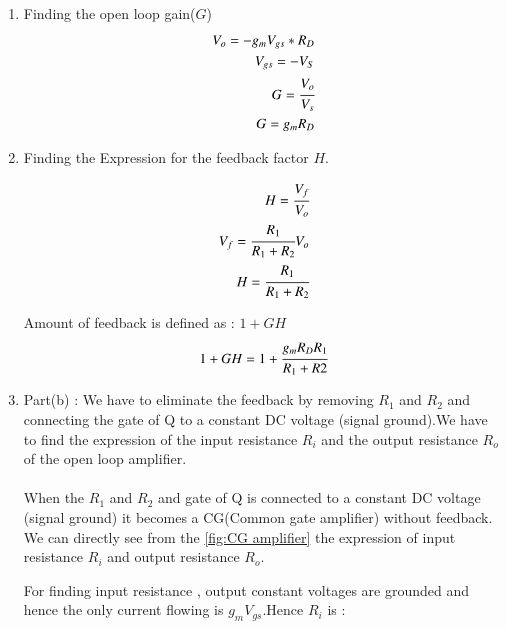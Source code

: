 \begin{enumerate}[label=\arabic*.,ref=\theenumi]
\item Finding the open loop gain($G$)\\
\solution
\begin{align}
V_{o} = -g_{m}V_{gs}*R_{D}\\
V_{gs} = -V_{S}\\
G = \cfrac{V_{o}}{V_{s}}\\
G = g_{m}R_{D}
\end{align}

\item Finding the Expression for the feedback factor $H$.\\
\solution

\begin{align}
H = \cfrac{V_{f}}{V_{o}}\\
V_{f} = \cfrac{R_{1}}{R_{1}+R_{2}}V_{o}\\
H = \cfrac{R_{1}}{R_{1}+R_{2}}
\end{align}


Amount of feedback is defined as : $1+GH$
\begin{align}
1+GH = 1 + \cfrac{g_{m}R_{D}R_{1}}{R_{1}+R{2}} 
\end{align}




\item Part(b) : We have to eliminate the feedback by removing $R_{1}$ and $R_{2}$ and connecting the gate of Q to a constant DC voltage (signal ground).We have to find the expression of the input resistance  $R_{i}$ and the output resistance $R_{o}$ of the open loop amplifier.\\
\solution\\
When the $R_{1}$ and $R_{2}$ and gate of Q is connected to a constant DC voltage (signal ground) it becomes a CG(Common gate amplifier) without feedback.
We can directly see from the \ref{fig:CG amplifier} the expression of input resistance $R_{i}$ and output resistance $R_{o}$.


For finding input resistance , output constant voltages are grounded and hence the only current flowing is $g_{m}V_{gs}$.Hence $R_{i}$ is :




\end{enumerate}
